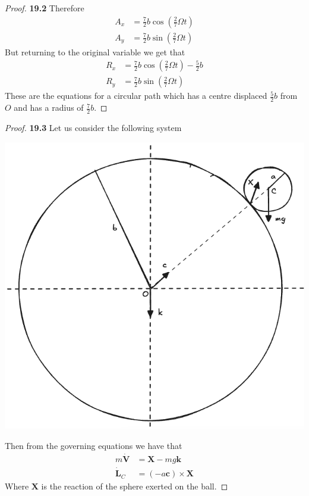 \documentclass[11pt]{article}
\theoremstyle{definition}
\begin{document}
\begin{proof}{\textbf{19.2}}
    Therefore
    \begin{align*}
        A_x &= \frac{7}{2}b\cos(\frac{2}{7}\Omega t)\\
        A_y &= \frac{7}{2}b\sin(\frac{2}{7}\Omega t)
    \end{align*}
    But returning to the original variable we get that
    \begin{align*}
        R_x &= \frac{7}{2}b\cos(\frac{2}{7}\Omega t) - \frac{5}{2}b\\
        R_y &= \frac{7}{2}b\sin(\frac{2}{7}\Omega t)
    \end{align*}
    These are the equations for a circular path which has a centre displaced
    $\frac{5}{2}b$ from $O$ and has a radius of $\frac{7}{2}b$.
\end{proof}
\cleardoublepage
\begin{proof}{\textbf{19.3}}
    Let us consider the following system
    \begin{center}
        \includegraphics[scale=0.3]{ch19-3.png}
    \end{center}
    Then from the governing equations we have that
    \begin{align*}
        m\bm{\dot{V}} &= \bm{X} - mg\bm{k}\\
        \bm{\dot{L}}_C &= (-a\bm{c}) \times \bm{X} 
    \end{align*}
    Where $\bm{X}$ is the reaction of the sphere exerted on the ball.

\end{proof}
\end{document}
